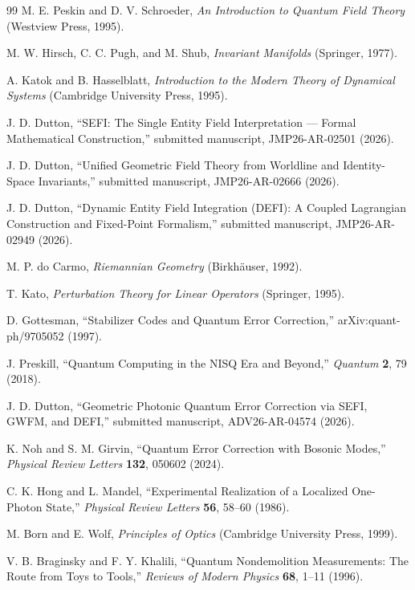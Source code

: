 \documentclass[aip,jmp,reprint,onecolumn,nofootinbib]{revtex4-2}
\begin{document}
\begin{thebibliography}{99}
  M. E. Peskin and D. V. Schroeder, \textit{An Introduction to Quantum Field Theory} (Westview Press, 1995). 

 M. W. Hirsch, C. C. Pugh, and M. Shub, \textit{Invariant Manifolds} (Springer, 1977). 

 A. Katok and B. Hasselblatt, \textit{Introduction to the Modern Theory of Dynamical Systems} (Cambridge University Press, 1995).

  J. D. Dutton, ``SEFI: The Single Entity Field Interpretation --- Formal Mathematical Construction,'' submitted manuscript, JMP26-AR-02501 (2026).

  J. D. Dutton, ``Unified Geometric Field Theory from Worldline and Identity-Space Invariants,'' submitted manuscript, JMP26-AR-02666 (2026).

  J. D. Dutton, ``Dynamic Entity Field Integration (DEFI): A Coupled Lagrangian Construction and Fixed-Point Formalism,'' submitted manuscript, JMP26-AR-02949 (2026). 

 M. P. do Carmo, \textit{Riemannian Geometry} (Birkhäuser, 1992).

  T. Kato, \textit{Perturbation Theory for Linear Operators} (Springer, 1995).

  D. Gottesman, ``Stabilizer Codes and Quantum Error Correction,'' arXiv:quant-ph/9705052 (1997).

  J. Preskill, ``Quantum Computing in the NISQ Era and Beyond,'' \textit{Quantum} \textbf{2}, 79 (2018). 

 J. D. Dutton, ``Geometric Photonic Quantum Error Correction via SEFI, GWFM, and DEFI,'' submitted manuscript, ADV26-AR-04574 (2026).

  K. Noh and S. M. Girvin, ``Quantum Error Correction with Bosonic Modes,'' \textit{Physical Review Letters} \textbf{132}, 050602 (2024).

  C. K. Hong and L. Mandel, ``Experimental Realization of a Localized One-Photon State,'' \textit{Physical Review Letters} \textbf{56}, 58--60 (1986).

  M. Born and E. Wolf, \textit{Principles of Optics} (Cambridge University Press, 1999). 

 V. B. Braginsky and F. Y. Khalili, ``Quantum Nondemolition Measurements: The Route from Toys to Tools,'' \textit{Reviews of Modern Physics} \textbf{68}, 1--11 (1996).


\end{thebibliography}
\end{document}
